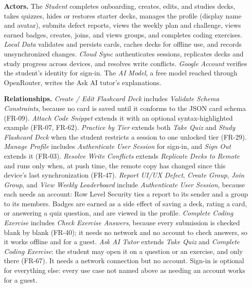 \documentclass[12pt,letterpaper]{article}
\begin{document}
\textbf{Actors.} The \emph{Student} completes onboarding, creates, edits, and studies
decks, takes quizzes, hides or restores starter decks, manages the profile (display
name and avatar), submits defect reports, views the weekly plan and challenge, views
earned badges, creates, joins, and views groups, and completes coding exercises.
\emph{Local Data} validates and persists cards,
caches decks for offline use, and records unsynchronized changes. \emph{Cloud Sync}
authenticates sessions, replicates decks and study progress across devices, and
resolves write conflicts.
\emph{Google Account} verifies the student's identity for sign-in. The \emph{AI Model},
a free model reached through OpenRouter, writes the Ask AI tutor's explanations.

\textbf{Relationships.} \emph{Create / Edit Flashcard Deck} includes \emph{Validate
Schema Constraints}, because no card is saved until it conforms to the JSON card schema
(FR-09). \emph{Attach Code Snippet} extends it with an optional syntax-highlighted
example (FR-07, FR-62). \emph{Practice by Tier} extends both \emph{Take Quiz} and
\emph{Study Flashcard Deck} when the student restricts a session to one unlocked tier
(FR-29). \emph{Manage Profile} includes \emph{Authenticate User Session} for sign-in,
and \emph{Sign Out} extends it (FR-03). \emph{Resolve Write Conflicts} extends
\emph{Replicate Decks to Remote} and runs only when, at push time, the remote copy has
changed since this device's last synchronization (FR-47). \emph{Report UI/UX Defect},
\emph{Create Group}, \emph{Join Group}, and \emph{View Weekly Leaderboard} include
\emph{Authenticate User Session}, because each needs an account: Row Level Security
ties a report to its sender and a group to its members. Badges are earned as a side
effect of saving a deck, rating a card, or answering a quiz question, and are viewed
in the profile. \emph{Complete Coding Exercise} includes \emph{Check Exercise
Answers}, because every submission is checked blank by blank (FR-40); it needs no
network and no account to check answers, so it works offline and for a guest. \emph{Ask AI Tutor}
extends \emph{Take Quiz} and \emph{Complete Coding Exercise}: the student may open it
on a question or an exercise, and only there (FR-67). It needs a network connection
but no account. Sign-in is optional for
everything else: every use case not named above as needing an account works for a
guest.
\end{document}
